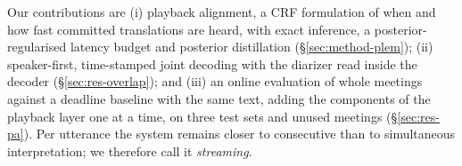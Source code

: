 Our contributions are (i) playback alignment, a CRF formulation of when and how fast committed translations are heard,
with exact inference, a posterior-regularised latency budget and posterior distillation (\S\ref{sec:method-plem});
(ii) speaker-first, time-stamped joint decoding with the diarizer read inside the decoder (\S\ref{sec:res-overlap});
and (iii) an online evaluation of whole meetings against a deadline baseline with the same text, adding the
components of the playback layer one at a time, on three test sets and unused meetings (\S\ref{sec:res-pa}). Per utterance the
system remains closer to consecutive than to simultaneous interpretation; we therefore call it \emph{streaming}.
